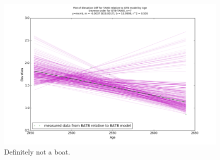 \documentclass{article}
\begin{document}
\begin{figure}[h]
	\includegraphics[width=\linewidth]{data/gias/theGIA_TAHB_relative_to_GTB.png}
	\caption{Definitely not a boat.}
	\label{fig:gias_TAHBxGTB}
\end{figure}
\newpage
\end{document}
